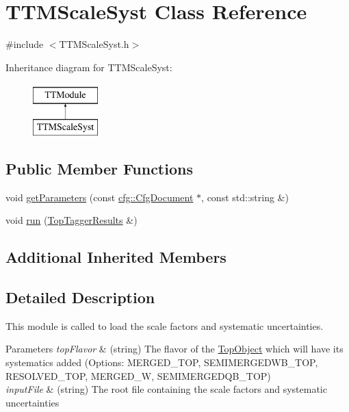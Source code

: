 \hypertarget{classTTMScaleSyst}{\section{T\-T\-M\-Scale\-Syst Class Reference}
\label{classTTMScaleSyst}
}


{\ttfamily \#include $<$T\-T\-M\-Scale\-Syst.\-h$>$}

Inheritance diagram for T\-T\-M\-Scale\-Syst\-:\begin{figure}[H]
\begin{center}
\leavevmode
\includegraphics[height=2.000000cm]{classTTMScaleSyst}
\end{center}
\end{figure}
\subsection*{Public Member Functions}
\begin{DoxyCompactItemize}
\item 
void \hyperlink{classTTMScaleSyst_a41c91f1f38431a28c1401034e5768969}{get\-Parameters} (const \hyperlink{classcfg_1_1CfgDocument}{cfg\-::\-Cfg\-Document} $\ast$, const std\-::string \&)
\item 
void \hyperlink{classTTMScaleSyst_a7ba1d3df652b583f75089495a7a8f215}{run} (\hyperlink{classTopTaggerResults}{Top\-Tagger\-Results} \&)
\end{DoxyCompactItemize}
\subsection*{Additional Inherited Members}


\subsection{Detailed Description}
This module is called to load the scale factors and systematic uncertainties.


\begin{DoxyParams}{Parameters}
{\em top\-Flavor} & (string) The flavor of the \hyperlink{classTopObject}{Top\-Object} which will have its systematics added (Options\-: M\-E\-R\-G\-E\-D\-\_\-\-T\-O\-P, S\-E\-M\-I\-M\-E\-R\-G\-E\-D\-W\-B\-\_\-\-T\-O\-P, R\-E\-S\-O\-L\-V\-E\-D\-\_\-\-T\-O\-P, M\-E\-R\-G\-E\-D\-\_\-\-W, S\-E\-M\-I\-M\-E\-R\-G\-E\-D\-Q\-B\-\_\-\-T\-O\-P) \\
\hline
{\em input\-File} & (string) The root file containing the scale factors and systematic uncertainties \\
\hline
\end{DoxyParams}


